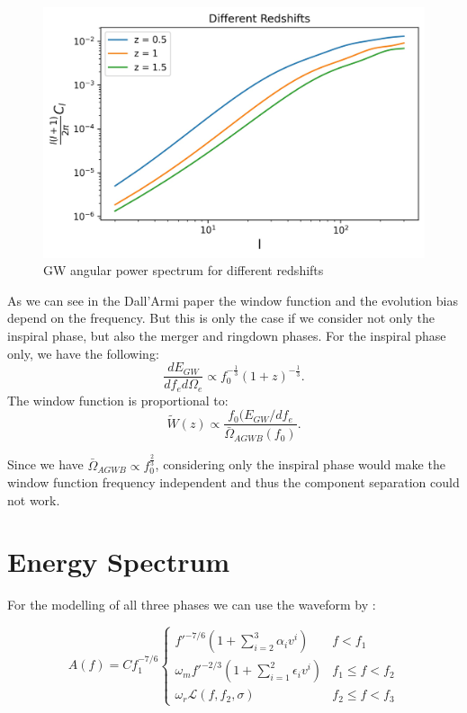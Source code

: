 \begin{figure}[h]
 \centering
 \includegraphics[width=0.7\linewidth]{Images/GW_autocorr_z.jpg}
 \caption{GW angular power spectrum for different redshifts}
 \label{plot_Cl_redshift}
\end{figure} 

As we can see in the Dall'Armi paper the window function and the evolution bias 
depend on the frequency. But this is only the case if we consider not only the
 inspiral phase, but also the merger and ringdown phases. For the inspiral phase
  only, we have the following:
\begin{equation}
    \frac{dE_{GW}}{df_e d\Omega_e} \propto f_0^{-\frac{1}{3}}(1+z)^{-\frac{1}{3}} .
\end{equation}
The window function is proportional to:
\begin{equation}
    \tilde{W}(z)\propto \frac{f_0(E_{GW}/df_e}{\bar{\Omega}_{AGWB}(f_0)} .
\end{equation}

Since we have $\bar{\Omega}_{AGWB}\propto f_0^{\frac{2}{3}}$, considering only 
the inspiral phase would make the window function frequency independent and thus the 
component separation could not work. 


\section{Energy Spectrum}


For the modelling of all three phases we can 
use the waveform by \cite{ajith_inspiral-merger-ringdown_2011}:

\[ A(f) = C f_1^{-7/6} \begin{cases}
        f'^{-7/6}(1+ \sum_{i=2}^3\alpha_i v^i) & f<f_1 \\
        \omega_m f'^{-2/3}(1+ \sum_{i=1}^2 \epsilon_i v^i) & f_1 \leq f < f_2 \\
        \omega_r \mathcal{L}(f, f_2, \sigma) & f_2 \leq f < f_3
\end{cases}
\]

